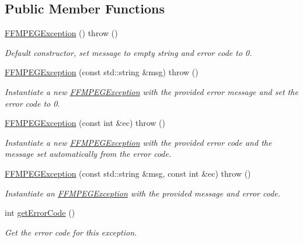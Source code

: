 \subsection*{Public Member Functions}
\begin{DoxyCompactItemize}
\item 
\hyperlink{classtranscode_1_1util_1_1FFMPEGException_a3e18fe9f063f97e2bcf3780fd957a8ba}{FFMPEGException} ()  throw ()
\begin{DoxyCompactList}\small\item\em Default constructor, set message to empty string and error code to 0. \item\end{DoxyCompactList}\item 
\hyperlink{classtranscode_1_1util_1_1FFMPEGException_ae593dd23fbd854835a78f4adc2c70f90}{FFMPEGException} (const std::string \&msg)  throw ()
\begin{DoxyCompactList}\small\item\em Instantiate a new \hyperlink{classtranscode_1_1util_1_1FFMPEGException}{FFMPEGException} with the provided error message and set the error code to 0. \item\end{DoxyCompactList}\item 
\hyperlink{classtranscode_1_1util_1_1FFMPEGException_a07fe05c4f009f2838f9a9e18ff99e607}{FFMPEGException} (const int \&ec)  throw ()
\begin{DoxyCompactList}\small\item\em Instantiate a new \hyperlink{classtranscode_1_1util_1_1FFMPEGException}{FFMPEGException} with the provided error code and the message set automatically from the error code. \item\end{DoxyCompactList}\item 
\hyperlink{classtranscode_1_1util_1_1FFMPEGException_a0b38fccbe2fdff8d15b50c28a851cdae}{FFMPEGException} (const std::string \&msg, const int \&ec)  throw ()
\begin{DoxyCompactList}\small\item\em Instantiate an \hyperlink{classtranscode_1_1util_1_1FFMPEGException}{FFMPEGException} with the provided message and error code. \item\end{DoxyCompactList}\item 
int \hyperlink{classtranscode_1_1util_1_1FFMPEGException_a08bfd7a8cc1c2dcd5fc54fe700db7806}{getErrorCode} ()
\begin{DoxyCompactList}\small\item\em Get the error code for this exception. \item\end{DoxyCompactList}\end{DoxyCompactItemize}


